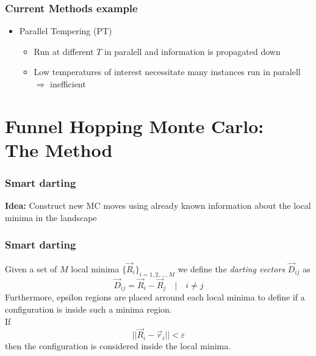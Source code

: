 \documentclass{beamer}
\begin{document}
	\begin{frame}
		\frametitle{Current Methods example}
		\begin{itemize}
			\item Parallel Tempering (PT)
			\begin{itemize}
				\item Run at different $T$ in paralell and information is propagated down
				\item Low temperatures of interest necessitate many instances run in paralell $\Rightarrow$ inefficient
			\end{itemize}
		
		\end{itemize}
	\end{frame}

	\section{Funnel Hopping Monte Carlo:\\The Method}
	\begin{frame}
		\frametitle{Smart darting}
		\textbf{Idea:} Construct new MC moves using already known information about the local minima in the landscape
	\end{frame}

	\begin{frame}
		\frametitle{Smart darting}
		Given a set of $M$ local minima $\{\vec{R}_i\}_{i=1,2,\hdots,M}$ we define the \emph{darting vectors} $\vec{D}_{ij}$ as
		\begin{equation}
			\vec{D}_{ij}=\vec{R}_i-\vec{R}_j\quad | \quad i\neq j
		\end{equation}
		Furthermore, epsilon regions are placed arround each local minima to define if a configuration is inside such a minima region.\\
		If
		\begin{equation}
			||\vec{R}_i-\vec{r}_i||<\varepsilon
		\end{equation}
		then the configuration is considered inside the local minima.
	\end{frame}
\end{document}
